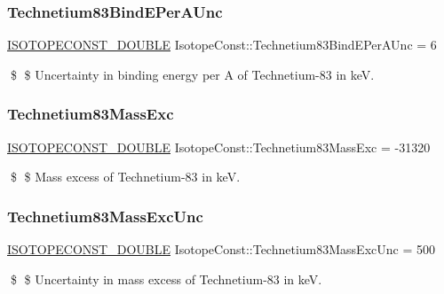 \subsubsection{\texorpdfstring{Technetium83\+Bind\+E\+Per\+A\+Unc}{Technetium83BindEPerAUnc}}
{\footnotesize\ttfamily \mbox{\hyperlink{group___isotope_const-_macros_ga8f45a7272ce02c0b4c65c44636ed719a}{I\+S\+O\+T\+O\+P\+E\+C\+O\+N\+S\+T\+\_\+\+D\+O\+U\+B\+LE}} Isotope\+Const\+::\+Technetium83\+Bind\+E\+Per\+A\+Unc = 6}

\$ \$ Uncertainty in binding energy per A of Technetium-\/83 in keV. \mbox{\label{group___isotope_const-_technetium-_tc83_ga5a13fb9f884457c99b266d617ea016fd}} 
\subsubsection{\texorpdfstring{Technetium83\+Mass\+Exc}{Technetium83MassExc}}
{\footnotesize\ttfamily \mbox{\hyperlink{group___isotope_const-_macros_ga8f45a7272ce02c0b4c65c44636ed719a}{I\+S\+O\+T\+O\+P\+E\+C\+O\+N\+S\+T\+\_\+\+D\+O\+U\+B\+LE}} Isotope\+Const\+::\+Technetium83\+Mass\+Exc = -\/31320}

\$ \$ Mass excess of Technetium-\/83 in keV. \mbox{\label{group___isotope_const-_technetium-_tc83_gaa5f1faed84e2848e8ebd89cc0cea8fa8}} 
\subsubsection{\texorpdfstring{Technetium83\+Mass\+Exc\+Unc}{Technetium83MassExcUnc}}
{\footnotesize\ttfamily \mbox{\hyperlink{group___isotope_const-_macros_ga8f45a7272ce02c0b4c65c44636ed719a}{I\+S\+O\+T\+O\+P\+E\+C\+O\+N\+S\+T\+\_\+\+D\+O\+U\+B\+LE}} Isotope\+Const\+::\+Technetium83\+Mass\+Exc\+Unc = 500}

\$ \$ Uncertainty in mass excess of Technetium-\/83 in keV. \mbox{\label{group___isotope_const-_technetium-_tc83_ga4dd7e04bb0f5f92ccf8efbce3716c6a4}} 

